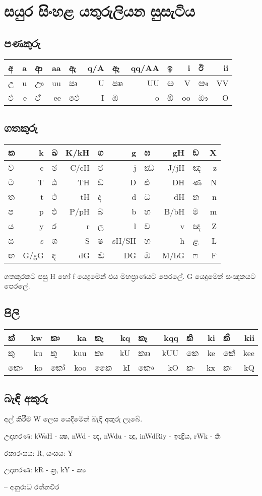 \documentclass[a4paper,12pt]{article}
\begin{document}
\section*{සයුර සිංහළ යතුරුලියන සුසැටිය}
\subsection*{පණකුරු}

\begin{tabular}{|lr|lr|lr|lr|lr|lr|}
\hline
අ & a & ආ & aa & ඇ & q/A & ඈ & qq/AA & ඉ & i & ඊ & ii \\
\hline
උ & u & ඌ & uu & ඍ & U & ඎ & UU & ඏ & V & ඐ & VV \\
\hline
එ & e & ඒ & ee & ඓ & I & ඔ & o & ඕ & oo & ඖ & O \\
\hline
\end{tabular}

\subsection*{ගතකුරු}

\begin{tabular}{|lr|lr|lr|lr|lr|}
\hline
ක & k & ඛ & K/kH & ග & g & ඝ & gH & ඞ & X \\
\hline
ච & c & ඡ & C/cH & ජ & j & ඣ & J/jH & ඤ & z \\
\hline
ට & T & ඨ & TH & ඩ & D & ඪ & DH & ණ & N \\
\hline
ත & t & ථ & tH & ද & d & ධ & dH & න & n \\
\hline
ප & p & ඵ & P/pH & බ & b & භ & B/bH & ම & m \\
\hline
ය & y & ර & r & ල & l & ව & v &  ඥ & Z \\
\hline
ස & s & ශ & S & ෂ & sH/SH & හ & h & ළ & L \\
\hline
ඟ & G/gG & ඳ & dG & ඬ & DG & ඹ & M/bG & ෆ & F \\
\hline
\end{tabular}

ගතකුරකට පසු H හෝ f යෙදුමෙන් එය මහප්‍රාණයට පෙරලේ. G යෙදුමෙන් සංඤකයට පෙරලේ.

\subsection*{පිලි}

\begin{tabular}{|lr|lr|lr|lr|lr|lr|}
\hline
ක් & kw & කා & ka & කැ & kq & කෑ & kqq & කි & ki & කී & kii \\
\hline
කු & ku & කූ & kuu & කෘ & kU & කෲ & kUU & කෙ & ke & කේ & kee \\
\hline
කො & ko & කෝ & koo & කෛ & kI & කෞ & kO & කං & kx & කඃ & kQ \\
\hline
\end{tabular}

\subsection*{බැඳි අකුරු}

අල් කිරීම W ලෙස යෙදීමෙන් බැඳි අකුරු ලැබේ.

උදාහරණ: kWsH - ක්‍ෂ, nWd - න්‍ද, nWdu - න්‍දු, inWdRiy - ඉන්‍ද්‍රිය, rWk - ර්‍ක

\medskip

රකාරංසය: R, යංසය: Y

උදාහරණ: kR - ක්‍ර, kY - ක්‍ය

\bigskip
\bigskip
\bigskip

-- අනුරාධ රත්නවීර
\end{document}
